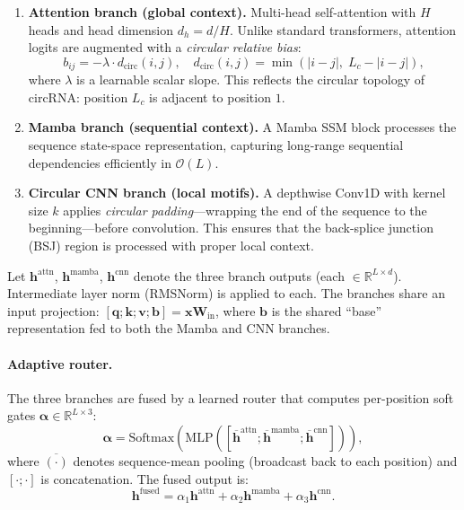 \documentclass[11pt]{article}
\begin{document}
\begin{enumerate}[label=\arabic*.,leftmargin=*]
  \item \textbf{Attention branch (global context).}
        Multi-head self-attention with $H$ heads and head dimension
        $d_h = d/H$.
        Unlike standard transformers, attention logits are augmented with a
        \emph{circular relative bias}:
        \begin{equation}
          b_{ij} = -\lambda \cdot d_{\text{circ}}(i, j),
          \quad
          d_{\text{circ}}(i,j) = \min(|i-j|,\; L_c - |i-j|),
          \label{eq:circ_bias}
        \end{equation}
        where $\lambda$ is a learnable scalar slope.
        This reflects the circular topology of circRNA: position $L_c$ is
        adjacent to position $1$.

  \item \textbf{Mamba branch (sequential context).}
        A Mamba SSM block \cite{mamba} processes the sequence state-space
        representation, capturing long-range sequential dependencies
        efficiently in $\mathcal{O}(L)$.

  \item \textbf{Circular CNN branch (local motifs).}
        A depthwise Conv1D with kernel size $k$ applies \emph{circular
        padding}---wrapping the end of the sequence to the beginning---before
        convolution.
        This ensures that the back-splice junction (BSJ) region is processed
        with proper local context.
\end{enumerate}

\noindent
Let $\mathbf{h}^{\text{attn}}$, $\mathbf{h}^{\text{mamba}}$,
$\mathbf{h}^{\text{cnn}}$ denote the three branch outputs (each
$\in \mathbb{R}^{L\times d}$).
Intermediate layer norm (RMSNorm) is applied to each.
The branches share an input projection:
$[\mathbf{q};\mathbf{k};\mathbf{v};\mathbf{b}] = \mathbf{x}\mathbf{W}_{\text{in}}$,
where $\mathbf{b}$ is the shared ``base'' representation fed to both the Mamba
and CNN branches.

\paragraph{Adaptive router.}
The three branches are fused by a learned router that computes per-position
soft gates $\boldsymbol{\alpha} \in \mathbb{R}^{L \times 3}$:
\begin{equation}
  \boldsymbol{\alpha} = \text{Softmax}\!\left(
    \text{MLP}\!\left([\overline{\mathbf{h}}^{\text{attn}};
                       \overline{\mathbf{h}}^{\text{mamba}};
                       \overline{\mathbf{h}}^{\text{cnn}}]\right)
  \right),
  \label{eq:router}
\end{equation}
where $\overline{(\cdot)}$ denotes sequence-mean pooling (broadcast back to
each position) and $[\cdot;\cdot]$ is concatenation.
The fused output is:
\begin{equation}
  \mathbf{h}^{\text{fused}} = \alpha_1\mathbf{h}^{\text{attn}}
    + \alpha_2\mathbf{h}^{\text{mamba}}
    + \alpha_3\mathbf{h}^{\text{cnn}}.
\end{equation}
\end{document}
